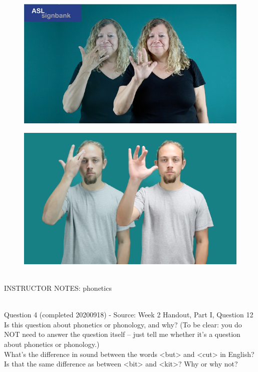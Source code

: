 \documentclass[12pt]{article}
\begin{document}
\begin{figure}[H]
\includegraphics{../images/asl_lucky.png}
\end{figure}
\begin{figure}[H]
\includegraphics{../images/asl_smart.png}
\end{figure}

~\\
INSTRUCTOR NOTES: phonetics


~\\

{\large Question 4} (completed 20200918) - Source: Week 2 Handout, Part I, Question 12\\

Is this question about phonetics or phonology, and why? (To be clear: you do NOT need to answer the question itself -- just tell me whether it's a question about phonetics or phonology.)\\

What’s the difference in sound between the words <but> and <cut> in English? Is that the same difference as between <bit> and <kit>? Why or why not?
\end{document}
